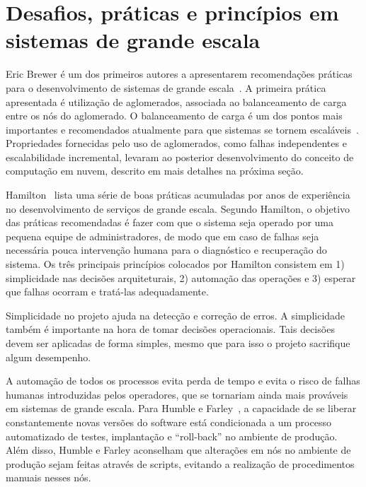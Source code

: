 \section{Desafios, práticas e princípios em sistemas de grande escala}

Eric Brewer é um dos primeiros autores a apresentarem recomendações práticas para o desenvolvimento de sistemas de grande escala~\cite{Brewer2001GiantScale}. A primeira prática apresentada é utilização de aglomerados, associada ao balanceamento de carga entre os nós do aglomerado. O balanceamento de carga é um dos pontos mais importantes e recomendados atualmente para que sistemas se tornem escaláveis~\cite{Amazon2012Practices}. Propriedades fornecidas pelo uso de aglomerados, como falhas independentes e escalabilidade incremental, levaram ao posterior desenvolvimento do conceito de computação em nuvem, descrito em mais detalhes na próxima seção. 

Hamilton~\cite{Hamilton2007InternetScale} lista uma série de boas práticas acumuladas por anos de experiência no desenvolvimento de serviços de grande escala. Segundo Hamilton, o objetivo das práticas recomendadas é fazer com que o sistema seja operado por uma pequena equipe de administradores, de modo que em caso de falhas seja necessária pouca intervenção humana para o diagnóstico e recuperação do sistema. Os três principais princípios colocados por Hamilton consistem em 1) simplicidade nas decisões arquiteturais, 2) automação das operações e 3) esperar que falhas ocorram e tratá-las adequadamente.

Simplicidade no projeto ajuda na detecção e correção de erros. A simplicidade também é importante na hora de tomar decisões operacionais. Tais decisões devem ser aplicadas de forma simples, mesmo que para isso o projeto sacrifique algum desempenho.

A automação de todos os processos evita perda de tempo e evita o risco de falhas humanas introduzidas pelos operadores, que se tornariam ainda mais prováveis em sistemas de grande escala. Para Humble e Farley~\cite{Humble2011Continuous}, a capacidade de se liberar constantemente novas versões do software está condicionada a um processo automatizado de testes, implantação e ``roll-back'' no ambiente de produção. Além disso, Humble e Farley aconselham que alterações em nós no ambiente de produção sejam feitas através de scripts, evitando a realização de procedimentos manuais nesses nós.

